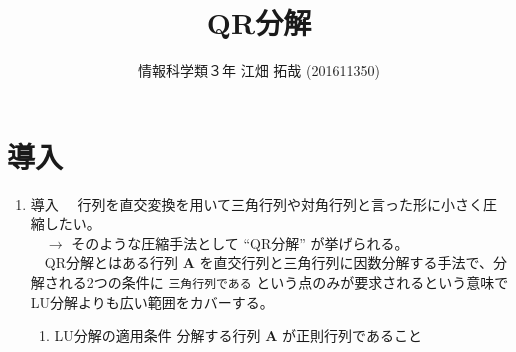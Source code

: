 \documentclass[dvipdfmx,10pt,presentation]{beamer}
\author{情報科学類３年 江畑 拓哉 (201611350)}
\date{}
\title{QR分解}
\begin{document}
\maketitle
\tableofcontents


\section{導入}
\label{sec:orga5147c1}
\begin{enumerate}
\item 導入
\label{sec:orgb1b1035}
　行列を直交変換を用いて三角行列や対角行列と言った形に小さく圧縮したい。\\
　\(\rightarrow\) そのような圧縮手法として ``QR分解'' が挙げられる。\\

　QR分解とはある行列 \(\bm{A}\) を直交行列と三角行列に因数分解する手法で、分解される2つの条件に \texttt{三角行列である} という点のみが要求されるという意味でLU分解よりも広い範囲をカバーする。\\
\begin{enumerate}
\item LU分解の適用条件
\label{sec:orgd84c49a}
分解する行列 \(\bm{A}\) が正則行列であること\\
\end{enumerate}
\end{enumerate}
\end{document}
